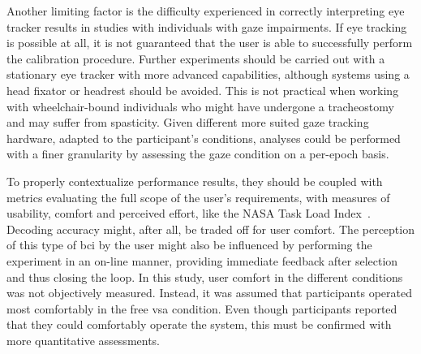 \documentclass[twocolumn]{article}
\begin{document}
Another limiting factor is the difficulty experienced in correctly interpreting eye
tracker results in studies with individuals with gaze impairments.
If eye tracking is possible at all, it is not guaranteed that the user is able
to successfully perform the calibration procedure.
Further experiments should be carried out with a stationary eye tracker with
more advanced capabilities, although systems using a head fixator or headrest
should be avoided.
This is not practical when working with
wheelchair-bound individuals who might have undergone a tracheostomy and may
suffer from spasticity.
Given different more suited gaze tracking hardware, adapted to the participant's
conditions, analyses could be performed with a finer granularity by assessing
the gaze condition on a per-epoch basis.

To properly contextualize performance results, they should be coupled with
metrics evaluating the full scope of the user's requirements, with measures of
usability, comfort and perceived effort, like the NASA Task Load
Index~\cite{Hart2006}.
Decoding accuracy might, after all, be traded off for user comfort.
The perception of this type of \ac{bci} by the user might also be influenced by
performing the experiment in an on-line manner, providing immediate feedback
after selection and thus closing the loop.
In this study, user comfort in the different conditions was not objectively
measured.
Instead, it was assumed that participants operated most comfortably in the free
\ac{vsa} condition.
Even though participants reported that they could comfortably operate the
system, this must be confirmed with more quantitative assessments.

\end{document}
